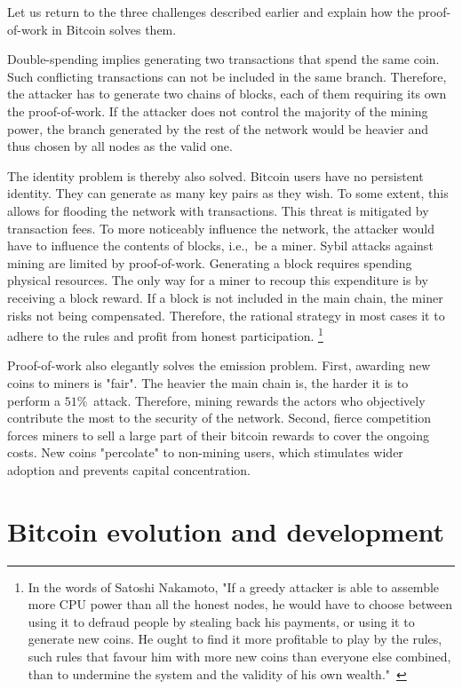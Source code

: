 Let us return to the three challenges described earlier and explain how the proof-of-work in Bitcoin solves them.

Double-spending implies generating two transactions that spend the same coin.
Such conflicting transactions can not be included in the same branch.
Therefore, the attacker has to generate two chains of blocks, each of them requiring its own the proof-of-work.
If the attacker does not control the majority of the mining power, the branch generated by the rest of the network would be heavier and thus chosen by all nodes as the valid one.

The identity problem is thereby also solved.
Bitcoin users have no persistent identity.
They can generate as many key pairs as they wish.
To some extent, this allows for flooding the network with transactions.
This threat is mitigated by transaction fees.
To more noticeably influence the network, the attacker would have to influence the contents of blocks, i.e.,~be a miner.
Sybil attacks against mining are limited by proof-of-work.
Generating a block requires spending physical resources.
The only way for a miner to recoup this expenditure is by receiving a block reward.
If a block is not included in the main chain, the miner risks not being compensated.
Therefore, the rational strategy in most cases it to adhere to the rules and profit from honest participation.
\footnote{In the words of Satoshi Nakamoto, "If a greedy attacker is able to assemble more CPU power than all the honest nodes, he would have to choose between using it to defraud people by stealing back his payments, or using it to generate new coins. He ought to find it more profitable to play by the rules, such rules that favour him with more new coins than everyone else combined, than to undermine the system and the validity of his own wealth."~\cite{nakamoto2008bitcoin}}

Proof-of-work also elegantly solves the emission problem.
First, awarding new coins to miners is "fair".
The heavier the main chain is, the harder it is to perform a $51\%$~attack.
Therefore, mining rewards the actors who objectively contribute the most to the security of the network.
Second, fierce competition forces miners to sell a large part of their bitcoin rewards to cover the ongoing costs.
New coins "percolate" to non-mining users, which stimulates wider adoption and prevents capital concentration.


\section{Bitcoin evolution and development}

